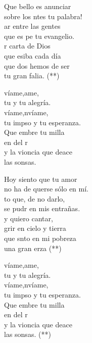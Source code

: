 \begin{cancion}%
	Que bello es anunciar \\
	sobre los ntes tu palabra!\\
	ar entre las gentes \\
	que es pe tu evangelio.\\
	r carta de Dios\\
	que esiba cada día\\
	que dos hemos de ser \\
	tu gran falia. (**)\jump\\
	\begin{chorus}%
		víame,ame,\\
		tu y tu alegría.\\
		víame,nvíame,\\
		tu impso y tu esperanza.\\
		Que embre tu milla\\
		en  del r\\
		y la vioncia que deace \\
		las sonsas.\jump\\
	\end{chorus}%
	\jump
Hoy siento que tu amor \\
	no ha de querse sólo en mí.\\
	to que, de no darlo,\\
	se pudr en mis entrañas.\\
	y quiero cantar,\\
	grir en cielo y tierra\\
	que snto en mi pobreza \\
	una gran erza (**)\jump\\
	\begin{chorus}%
		víame,ame,\\
		tu y tu alegría.\\
		víame,nvíame,\\
		tu impso y tu esperanza.\\
		Que embre tu milla\\
		en  del \chord{do}{m}{dolo}r\\
		y la vioncia que deace \\
		las sonsas. (**)\jump\\
	\end{chorus}%
	\jump
	\jump
\end{cancion}%
